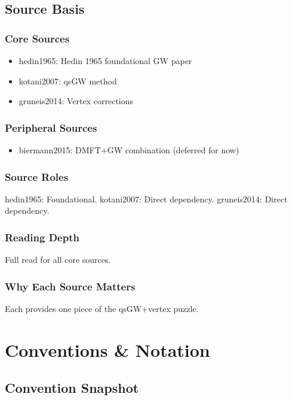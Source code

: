 \documentclass[11pt,a4paper]{article}
\begin{document}
\subsection*{Source Basis}

\subsubsection*{Core Sources}
\begin{itemize}
\item hedin1965: Hedin 1965 foundational GW paper
\item kotani2007: qsGW method
\item gruneis2014: Vertex corrections
\end{itemize}

\subsubsection*{Peripheral Sources}
\begin{itemize}
\item biermann2015: DMFT+GW combination (deferred for now)
\end{itemize}

\subsubsection*{Source Roles}
hedin1965: Foundational. kotani2007: Direct dependency. gruneis2014: Direct dependency.

\subsubsection*{Reading Depth}
Full read for all core sources.

\subsubsection*{Why Each Source Matters}
Each provides one piece of the qsGW+vertex puzzle.



\section{Conventions \& Notation}

\subsection*{Convention Snapshot}
\end{document}
